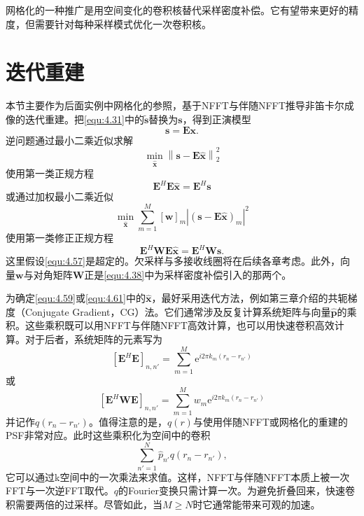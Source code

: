 \documentclass[12pt]{article}
\let\originallautoref\autoref
\renewcommand{\autoref}[1]{\allowbreak\originallautoref{#1}}
\begin{document}
网格化的一种推广是用空间变化的卷积核替代采样密度补偿。它有望带来更好的精度，但需要针对每种采样模式优化一次卷积核。

\section{迭代重建}
本节主要作为后面实例中网格化的参照，基于NFFT与伴随NFFT推导非笛卡尔成像的迭代重建。把\autoref{equ:4.31}中的$\tilde{\bm{s}}$替换为$\bm{s}$，得到正演模型
\begin{equation}
    \bm{s}=\mathbf{E}\bm{x}.
    \label{equ:4.57}
\end{equation}
逆问题通过最小二乘近似求解
\begin{equation}
    \min_{\hat{\bm{x}}}\left\|\bm{s}-\mathbf{E}\hat{\bm{x}}\right\|_2^2
    \label{equ:4.58}
\end{equation}
使用第一类正规方程
\begin{equation}
    \mathbf{E}^H\mathbf{E}\hat{\bm{x}}=\mathbf{E}^H\bm{s}
    \label{equ:4.59}
\end{equation}
或通过加权最小二乘近似
\begin{equation}
    \min_{\hat{\bm{x}}}\sum_{m=1}^{M}[\bm{w}]_m\left|\left(\bm{s}-\mathbf{E}\hat{\bm{x}}\right)_m\right|^2
    \label{equ:4.60}
\end{equation}
使用第一类修正正规方程
\begin{equation}
    \mathbf{E}^H\mathbf{W}\mathbf{E}\hat{\bm{x}}=\mathbf{E}^H\mathbf{W}\bm{s}.
    \label{equ:4.61}
\end{equation}
这里假设\autoref{equ:4.57}是超定的。欠采样与多接收线圈将在后续各章考虑。此外，向量$\bm{w}$与对角矩阵$\mathbf{W}$正是\autoref{equ:4.38}中为采样密度补偿引入的那两个。

为确定\autoref{equ:4.59}或\autoref{equ:4.61}中的$\hat{\bm{x}}$，最好采用迭代方法，例如第三章介绍的共轭梯度（Conjugate Gradient，CG）\label{term:CG}法。它们通常涉及反复计算系统矩阵与向量$\hat{\bm{p}}$的乘积。这些乘积既可以用NFFT与伴随NFFT高效计算，也可以用快速卷积高效计算。对于后者，系统矩阵的元素写为
\begin{equation}
    \left[\mathbf{E}^H\mathbf{E}\right]_{n,n'}=\sum_{m=1}^{M}\mathrm{e}^{i2\pi k_m\left(r_n-r_{n'}\right)}
    \label{equ:4.62}
\end{equation}
或
\begin{equation}
    \left[\mathbf{E}^H\mathbf{W}\mathbf{E}\right]_{n,n'}=\sum_{m=1}^{M}w_m\mathrm{e}^{i2\pi k_m\left(r_n-r_{n'}\right)}
    \label{equ:4.63}
\end{equation}
并记作$q(r_n-r_{n'})$。值得注意的是，$q(r)$与使用伴随NFFT或网格化的重建的PSF非常对应。此时这些乘积化为空间中的卷积
\begin{equation}
    \sum_{n'=1}^{N}\hat{p}_{n'}q(r_n-r_{n'}),
    \label{equ:4.64}
\end{equation}
它可以通过k空间中的一次乘法来求值。这样，NFFT与伴随NFFT本质上被一次FFT与一次逆FFT取代。$q$的Fourier变换只需计算一次。为避免折叠回来，快速卷积需要两倍的过采样。尽管如此，当$M\ge N$时它通常能带来可观的加速。
\end{document}
